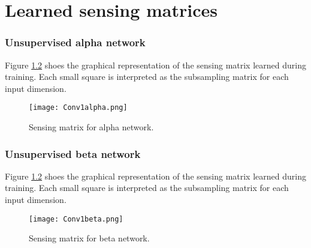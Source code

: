 \appendix
\chapter{Learned sensing matrices}
\subsection{Unsupervised alpha network}

Figure \ref{fig:Phial} shoes the graphical representation of the sensing matrix learned during training. Each small square is interpreted as the subsampling matrix for each input dimension.

\begin{figure}[!htb] 
\vspace{1cm}
\centering 
\texttt{[image: Conv1alpha.png]}
\caption[Learned sensing matrix for alpha network]{Sensing matrix for alpha network.}
\label{fig:Phial} 
\end{figure} 

\FloatBarrier


\subsection{Unsupervised beta network}

Figure \ref{fig:Phial} shoes the graphical representation of the sensing matrix learned during training. Each small square is interpreted as the subsampling matrix for each input dimension.

\begin{figure}[!htb] 
\vspace{1cm}
\centering 
\texttt{[image: Conv1beta.png]}
\caption[Learned sensing matrix for alpha network]{Sensing matrix for beta network.}
\label{fig:Phial} 
\end{figure} 

\FloatBarrier

